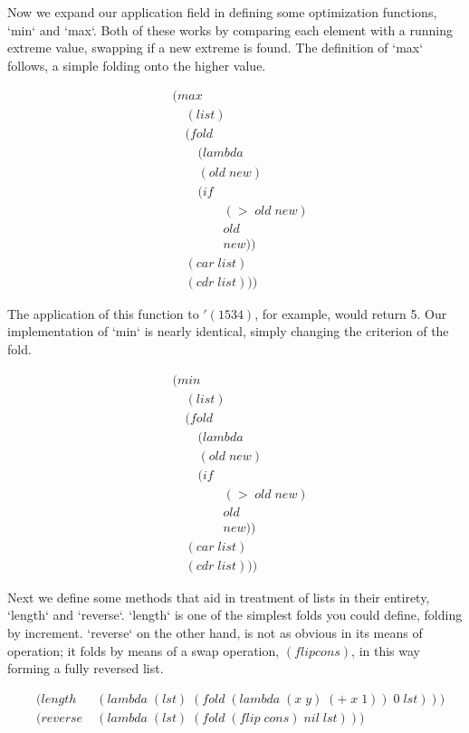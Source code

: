 \documentclass[11pt]{article}
\begin{document}
Now we expand our application field in defining some optimization functions, `min` and `max`. Both of these works by comparing each element with a running extreme value, swapping if a new extreme is found. The definition of `max` follows, a simple folding onto the higher value.

\begin{align*}
& (max \; 
\\& \quad (list)
\\& \quad (fold \; 
\\& \qquad (lambda \; 
\\& \qquad (old \; new)
\\& \qquad (if
\\& \qquad \qquad (> \; old \; new)
\\& \qquad \qquad old
\\& \qquad \qquad new))
\\& \quad (car \; list)
\\& \quad (cdr \; list)))
\end{align*}

The application of this function to $'(1 5 3 4)$, for example, would return 5. Our implementation of `min` is nearly identical, simply changing the criterion of the fold.

\begin{align*}
& (min \; 
\\& \quad (list)
\\& \quad (fold \; 
\\& \qquad (lambda \; 
\\& \qquad (old \; new)
\\& \qquad (if
\\& \qquad \qquad (> \; old \; new)
\\& \qquad \qquad old
\\& \qquad \qquad new))
\\& \quad (car \; list)
\\& \quad (cdr \; list)))
\end{align*}

Next we define some methods that aid in treatment of lists in their entirety, `length` and `reverse`. `length` is one of the simplest folds you could define, folding by increment. `reverse` on the other hand, is not as obvious in its means of operation; it folds by means of a swap operation, $(flip cons)$, in this way forming a fully reversed list.

\begin{align*}
& (length \; &(lambda \; (lst) \; (fold \; (lambda \; (x \; y) \; (+ \; x \; 1)) \; 0 \; lst)))
\\& (reverse \; &(lambda \; (lst) \; (fold \; (flip \; cons) \; nil \; lst)))
\end{align*}
\end{document}
